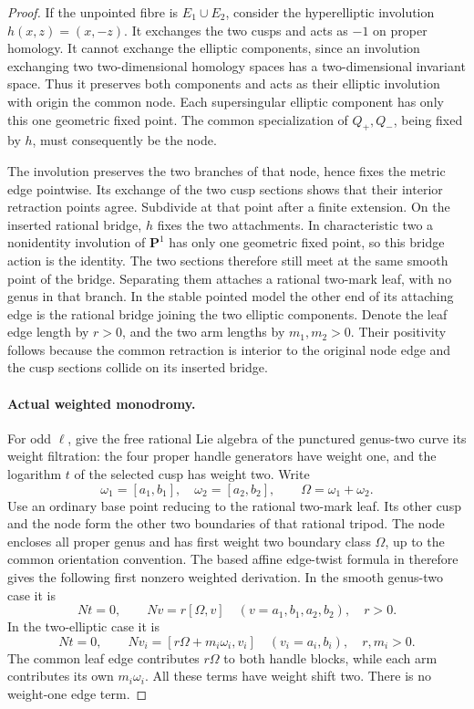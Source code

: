 \begin{proof}
If the unpointed fibre is \(E_1\cup E_2\), consider
the hyperelliptic involution \(h(x,z)=(x,-z)\).
It exchanges the two cusps and acts as \(-1\) on
proper homology. It cannot exchange the elliptic
components, since an involution exchanging two
two-dimensional homology spaces has a two-dimensional
invariant space. Thus it preserves both components
and acts as their elliptic involution with origin
the common node. Each supersingular elliptic
component has only this one geometric fixed point.
The common specialization of \(Q_+,Q_-\), being
fixed by \(h\), must consequently be the node.

The involution preserves the two branches of that
node, hence fixes the metric edge pointwise. Its
exchange of the two cusp sections shows that their
interior retraction points agree. Subdivide at that
point after a finite extension. On the inserted
rational bridge, \(h\) fixes the two attachments.
In characteristic two a nonidentity involution of
\(\mathbf P^1\) has only one geometric fixed point,
so this bridge action is the identity. The two
sections therefore still meet at the same smooth
point of the bridge. Separating them attaches a
rational two-mark leaf, with no genus in that
branch. In the stable pointed model the other end
of its attaching edge is the rational bridge
joining the two elliptic components. Denote the
leaf edge length by \(r>0\), and the two arm lengths
by \(m_1,m_2>0\). Their positivity follows because
the common retraction is interior to the original
node edge and the cusp sections collide on its
inserted bridge.

\paragraph{Actual weighted monodromy.}
For odd \(\ell\), give the free rational Lie algebra
of the punctured genus-two curve its weight filtration:
the four proper handle generators have weight one,
and the logarithm \(t\) of the selected cusp has
weight two. Write
\[
 \omega_1=[a_1,b_1],\quad\omega_2=[a_2,b_2],
 \qquad\Omega=\omega_1+\omega_2.
\]
Use an ordinary base point reducing to the rational
two-mark leaf. Its other cusp and the node form the
other two boundaries of that rational tripod.
The node encloses all proper genus and has first
weight two boundary class \(\Omega\), up to the
common orientation convention. The based affine
edge-twist formula in
\cite[Definition 3.1.5 and Theorem 3.1.6]{fghBettsDogra}
therefore gives the following first nonzero weighted
derivation. In the smooth genus-two case it is
\[
                 Nt=0,\qquad Nv=r[\Omega,v]
                  \quad(v=a_1,b_1,a_2,b_2),\quad r>0.
                                                               \tag{A.39.3}
\]
In the two-elliptic case it is
\[
             Nt=0,\qquad
             Nv_i=[r\Omega+m_i\omega_i,v_i]
                  \quad(v_i=a_i,b_i),\quad r,m_i>0.
                                                               \tag{A.39.4}
\]
The common leaf edge contributes \(r\Omega\) to
both handle blocks, while each arm contributes its
own \(m_i\omega_i\). All these terms have weight
shift two. There is no weight-one edge term.


\end{proof}
